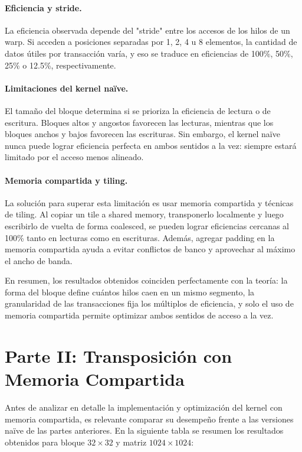 \documentclass[a4paper,11pt]{article}
\begin{document}
\paragraph{Eficiencia y stride.}
La eficiencia observada depende del "stride" entre los accesos de los hilos de un warp. Si acceden a posiciones separadas por 1, 2, 4 u 8 elementos, la cantidad de datos útiles por transacción varía, y eso se traduce en eficiencias de 100\%, 50\%, 25\% o 12.5\%, respectivamente.

\paragraph{Limitaciones del kernel naïve.}
El tamaño del bloque determina si se prioriza la eficiencia de lectura o de escritura. Bloques altos y angostos favorecen las lecturas, mientras que los bloques anchos y bajos favorecen las escrituras. Sin embargo, el kernel naïve nunca puede lograr eficiencia perfecta en ambos sentidos a la vez: siempre estará limitado por el acceso menos alineado.

\paragraph{Memoria compartida y tiling.}
La solución para superar esta limitación es usar memoria compartida y técnicas de tiling. Al copiar un tile a shared memory, transponerlo localmente y luego escribirlo de vuelta de forma coalesced, se pueden lograr eficiencias cercanas al 100\% tanto en lecturas como en escrituras. Además, agregar padding en la memoria compartida ayuda a evitar conflictos de banco y aprovechar al máximo el ancho de banda.

En resumen, los resultados obtenidos coinciden perfectamente con la teoría: la forma del bloque define cuántos hilos caen en un mismo segmento, la granularidad de las transacciones fija los múltiplos de eficiencia, y solo el uso de memoria compartida permite optimizar ambos sentidos de acceso a la vez.

\section{Parte II: Transposición con Memoria Compartida}
Antes de analizar en detalle la implementación y optimización del kernel con memoria compartida, es relevante comparar su desempeño frente a las versiones naïve de las partes anteriores. En la siguiente tabla se resumen los resultados obtenidos para bloque $32\times32$ y matriz $1024\times1024$:
\end{document}
